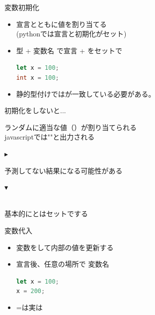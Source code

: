 \documentclass[dvipdfmx]{beamer}
\begin{document}
  \begin{frame}{変数}{初期化}
    \begin{itemize}
      \item 宣言とともに値を割り当てる\\
      (pythonでは宣言と初期化がセット)
      \item 型 + 変数名 で宣言 + をセットで\\
      \begin{center}
        \lstinline[language=javascript]|let x = 100;|\\
        \lstinline[language=c]|int x = 100;|
      \end{center}
      \item 静的型付けではが一致している必要がある。\\
      \begin{center}
      \end{center}
    \end{itemize}
    \vspace{3mm}
    \begin{large}初期化をしないと...\end{large}
    \begin{center}
      ランダムに適当な値（）が割り当てられる\\
      javascriptでは""と出力される\\
      \quad\begin{large}$\blacktriangleright$\end{large}予測してない結果になる可能性がある\\
      \begin{Large}$\blacktriangledown$\end{Large}\\
      基本的にとはセットでする
    \end{center}
  \end{frame}

  \begin{frame}{変数}{代入}
    \begin{itemize}
      \setlength{\itemsep}{5mm}
      \item 変数をして内部の値を更新する
      \item 宣言後、任意の場所で 変数名 \\
      \begin{center}
        \lstinline[language=javascript]|let x = 100;|\\
        \lstinline[language=javascript]|x = 200;|
      \end{center}
      \item =は実は
    \end{itemize}
  \end{frame}
\end{document}
